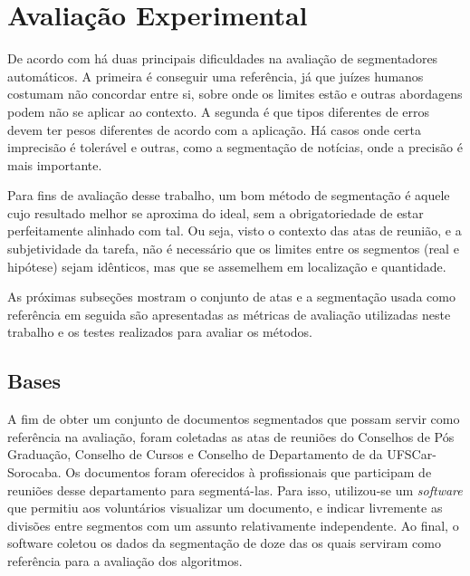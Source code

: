 
\section{Avaliação Experimental}
\label{sec:avaliacao}





De acordo com \cite{Pevzner2002} há duas principais dificuldades na avaliação de segmentadores automáticos. A primeira é conseguir uma referência, já que juízes humanos costumam não concordar entre si, sobre onde os limites estão e outras abordagens podem não se aplicar ao contexto. A segunda é que tipos diferentes de erros devem ter pesos diferentes de acordo com a aplicação. Há casos onde certa imprecisão é tolerável e outras, como a segmentação de notícias, onde a precisão é mais importante.


Para fins de avaliação desse trabalho, um bom método de segmentação é aquele cujo resultado melhor se aproxima do ideal, sem a obrigatoriedade de estar perfeitamente alinhado com tal. Ou seja, visto o contexto das atas de reunião, e a subjetividade da tarefa, não é necessário que os limites entre os segmentos (real e hipótese) sejam idênticos, mas que se assemelhem em localização e quantidade.




As próximas subseções mostram o conjunto de atas e a segmentação usada como referência em seguida são apresentadas as métricas de avaliação utilizadas neste trabalho e os testes realizados para avaliar os métodos.



\subsection{Bases}
	\label{subsec:bases}

	
A fim de obter um conjunto de documentos segmentados que possam servir como referência na avaliação, foram coletadas as atas de reuniões do Conselhos de Pós Graduação, Conselho de Cursos e Conselho de Departamento de da UFSCar-Sorocaba. Os documentos foram oferecidos à profissionais que participam de reuniões desse departamento para segmentá-las. Para isso, utilizou-se um \textit{software} que permitiu aos voluntários visualizar um documento, e indicar livremente as divisões entre segmentos com um assunto relativamente independente. Ao final, o software coletou os dados da segmentação de doze das os quais serviram como referência para a avaliação dos algoritmos.


